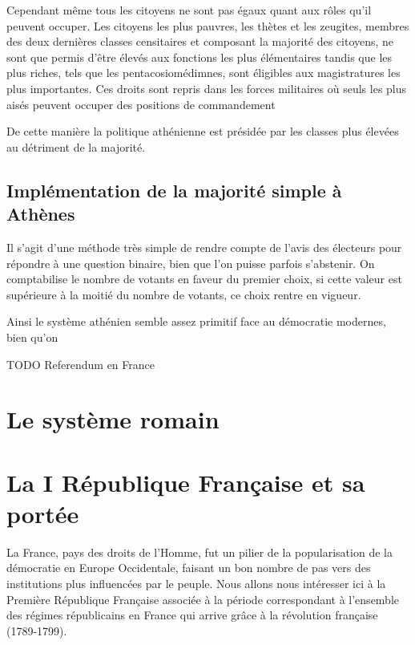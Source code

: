 \documentclass[12pt,a4paper]{report}
\begin{document}
Cependant même tous les citoyens ne sont pas égaux quant aux rôles qu'il peuvent occuper.
Les citoyens les plus pauvres, les thètes et les zeugites, membres des deux dernières classes censitaires et composant la majorité des citoyens, ne sont que permis d'être élevés aux fonctions les plus élémentaires\nocite{wiki:thetes} tandis que les plus riches, tels que les pentacosiomédimnes, sont éligibles aux magistratures les plus importantes.\nocite{wiki:penta}
Ces droits sont repris dans les forces militaires où seuls les plus aisés peuvent occuper des positions de commandement\nocite{aristote:constitathenes}

De cette manière la politique athénienne est présidée par les classes plus élevées au détriment de la majorité.

\nocite{wiki:histdemo}
\subsection{Implémentation de la majorité simple à Athènes}
Il s'agit d'une méthode très simple de rendre compte de l'avis des électeurs pour répondre à une question binaire, bien que l'on puisse parfois s'abstenir.
On comptabilise le nombre de votants en faveur du premier choix, si cette valeur est supérieure à la moitié du nombre de votants, ce choix rentre en vigueur.



Ainsi le système athénien semble assez primitif face au démocratie modernes, bien qu'on 




TODO Referendum en France

\section{Le système romain}

\section{La I République Française et sa portée}
La France, pays des droits de l'Homme, fut un pilier de la popularisation de la démocratie en Europe Occidentale, faisant un bon nombre de pas vers des institutions plus influencées par le peuple.
Nous allons nous intéresser ici à la Première République Française associée à la période correspondant à l'ensemble des régimes républicains en France qui arrive grâce à la révolution française (1789-1799). \nocite{wiki:premiererep}
\end{document}
